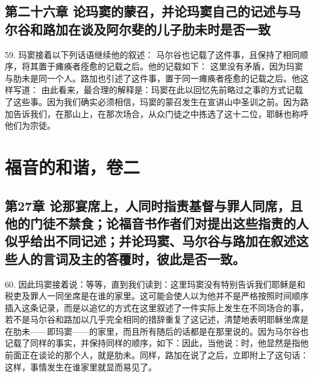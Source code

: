 
\subsection{第二十六章 论玛窦的蒙召，并论玛窦自己的记述与马尔谷和路加在谈及阿尔斐的儿子肋未时是否一致}

59. 玛窦接着以下列话语继续他的叙述： 马尔谷也记载了这件事，且保持了相同顺序，将其置于瘫痪者痊愈的记载之后。他的记载如下： 这里没有矛盾，因为玛窦与肋未是同一个人。路加也引述了这件事，置于同一瘫痪者痊愈的记载之后。他这样写道： 由此看来，最合理的解释是：玛窦在此以回忆先前略过之事的方式记载了这些事。因为我们确实必须相信，玛窦的蒙召发生在宣讲山中圣训之前。因为路加告诉我们，在那山上，在那次场合，从众门徒之中拣选了这十二位，耶稣也称呼他们为宗徒。\par



\section{福音的和谐，卷二}


\subsection{第27章 论那宴席上，人同时指责基督与罪人同席，且他的门徒不禁食；论福音书作者们对提出这些指责的人似乎给出不同记述；并论玛窦、马尔谷与路加在叙述这些人的言词及主的答覆时，彼此是否一致。}

60. 因此玛窦接着说：等等，直到我们读到：这里玛窦没有特别告诉我们耶稣是和税吏及罪人一同坐席是在谁的家里。这可能会使人以为他并不是严格按照时间顺序插入这条记录，而是以追忆的方式在这里叙述了一件实际上发生在不同场合的事，若不是马尔谷和路加以几乎完全相同的措辞重复了这记述，清楚地表明耶稣坐席是在肋未——即玛窦——的家里，而且所有随后的话都是在那里说的。因为马尔谷也记载了同样的事实，并保持同样的顺序，如下：因此，当他说：时，他显然是指他前面正在谈论的那个人，就是肋未。同样，路加在说了之后，立即附上了这句话：这样，事情发生在谁家里就显而易见了。\par

